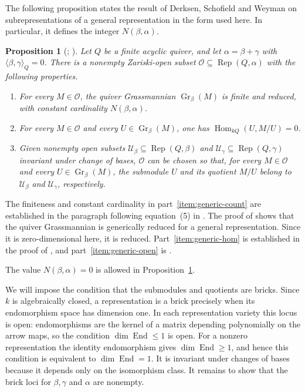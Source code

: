 \documentclass[a4paper,reqno,10pt]{amsart}
\newtheorem{proposition}[theorem]{Proposition}
\theoremstyle{definition}
\numberwithin{equation}{section}
\newcommand{\End}{\operatorname{End}}
\newcommand{\Hom}{\operatorname{Hom}}
\newcommand{\Gr}{\operatorname{Gr}}
\newcommand{\Rep}{\operatorname{Rep}}
\begin{document}
The following proposition states the result of Derksen, Schofield and
Weyman on subrepresentations of a general representation in the form
used here. In particular, it defines the integer $N(\beta,\alpha)$.

\begin{proposition}[{\cite[p.~139, proof of Corollary~12 and
Proposition~13]{DSW}; \cite[proof of Corollary~3]{CB}}]\label{prop:genericity}
Let $Q$ be a finite acyclic quiver, and let
$\alpha=\beta+\gamma$ with $\langle\beta,\gamma\rangle_Q=0$.
There is a nonempty Zariski-open subset $\mathcal O\subseteq\Rep(Q,\alpha)$
with the following properties.
\begin{enumerate}
\item\label{item:generic-count}
For every $M\in\mathcal O$, the quiver Grassmannian $\Gr_\beta(M)$
is finite and reduced, with constant cardinality $N(\beta,\alpha)$.
\item\label{item:generic-hom}
For every $M\in\mathcal O$ and every $U\in\Gr_\beta(M)$,
one has $\Hom_{kQ}(U,M/U)=0$.
\item\label{item:generic-open}
Given nonempty open subsets
$\mathcal U_\beta\subseteq\Rep(Q,\beta)$ and
$\mathcal U_\gamma\subseteq\Rep(Q,\gamma)$ invariant under change of
bases, $\mathcal O$ can be chosen so that, for every $M\in\mathcal O$
and every $U\in\Gr_\beta(M)$, the submodule $U$ and its quotient
$M/U$ belong to $\mathcal U_\beta$ and $\mathcal U_\gamma$,
respectively.
\end{enumerate}
\end{proposition}

The finiteness and constant cardinality in part~\ref{item:generic-count}
are established in the paragraph following equation~(5) in
\cite[p.~139]{DSW}. The proof of \cite[Corollary~3]{CB} shows that the
quiver Grassmannian is generically reduced for a general representation.
Since it is zero-dimensional here, it is reduced.
Part~\ref{item:generic-hom} is established in
the proof of \cite[Corollary~12]{DSW}, and
part~\ref{item:generic-open} is \cite[Proposition~13]{DSW}.

The value $N(\beta,\alpha)=0$ is allowed in
Proposition~\ref{prop:genericity}.

We will impose the condition that the submodules and quotients are
bricks. Since $k$ is algebraically closed, a representation is a brick
precisely when its endomorphism space has dimension one. In each
representation variety
this locus is open: endomorphisms are the kernel of a matrix depending
polynomially on the arrow maps, so the condition $\dim\End\leq1$ is open.
For a nonzero representation the identity endomorphism gives
$\dim\End\geq1$, and hence this condition is equivalent to $\dim\End=1$.
It is invariant under changes of bases because it depends only on
the isomorphism class. It remains to show that the brick loci for
$\beta,\gamma$ and $\alpha$ are nonempty.
\end{document}
